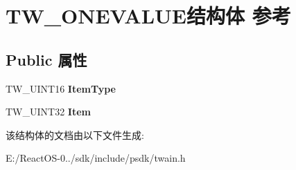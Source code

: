 \hypertarget{struct_t_w___o_n_e_v_a_l_u_e}{}\section{T\+W\+\_\+\+O\+N\+E\+V\+A\+L\+U\+E结构体 参考}
\label{struct_t_w___o_n_e_v_a_l_u_e}
\subsection*{Public 属性}
\begin{DoxyCompactItemize}
\item 
\mbox{\label{struct_t_w___o_n_e_v_a_l_u_e_ac7b88305407cdcf4c2e265ccf80f7d51}} 
T\+W\+\_\+\+U\+I\+N\+T16 {\bfseries Item\+Type}
\item 
\mbox{\label{struct_t_w___o_n_e_v_a_l_u_e_aea3692a0e2ba50078d36edf7f93ff799}} 
T\+W\+\_\+\+U\+I\+N\+T32 {\bfseries Item}
\end{DoxyCompactItemize}


该结构体的文档由以下文件生成\+:\begin{DoxyCompactItemize}
\item 
E\+:/\+React\+O\+S-\/0../sdk/include/psdk/twain.\+h\end{DoxyCompactItemize}
